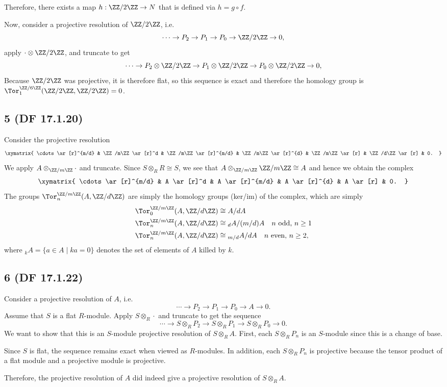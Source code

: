 \documentclass[12pt, reqno]{amsart}
\begin{document}
Therefore, there exists a map $h : \ZZ / 2\ZZ \to N$ that is defined via
$h = g \circ f$.

Now, consider a projective resolution of $\ZZ / 2\ZZ$, i.e.
\[ 
\cdots \to P_2 \to P_1 \to P_0 \to \ZZ / 2\ZZ \to 0,
\] 
apply $\cdot \otimes \ZZ / 2\ZZ$, and truncate to get
\[ 
\cdots \to P_2 \otimes \ZZ /2\ZZ \to P_1 \otimes \ZZ / 2\ZZ 
	\to P_0 \otimes \ZZ/2\ZZ \to 0,
\] 
Because $\ZZ / 2\ZZ$ was projective, it is therefore flat, so this sequence is
exact and therefore the homology group is 
$\Tor_1^{\ZZ/6\ZZ} (\ZZ / 2\ZZ , \ZZ / 2\ZZ) = 0$.

\subsection*{5 (DF 17.1.20)}

Consider the projective resolution
\[ 
\xymatrix{
\cdots \ar[r]^{m/d} & \ZZ/m\ZZ \ar[r]^d & \ZZ/m\ZZ \ar[r]^{m/d} 
	& \ZZ/m\ZZ \ar[r]^{d} & \ZZ/m\ZZ \ar[r] & \ZZ/d\ZZ \ar[r] & 0.
}
\]
We apply $A \otimes_{\ZZ/m\ZZ} \cdot$ and truncate. Since 
$S \otimes_R R \cong S$, we see that $A \otimes_{\ZZ/m\ZZ} \ZZ /m\ZZ \cong A$ and
hence we obtain the complex
\[ 
\xymatrix{
\cdots \ar[r]^{m/d} & A \ar[r]^d & A \ar[r]^{m/d} 
	& A \ar[r]^{d} & A \ar[r] & 0.
}
\]
The groups $\Tor_n^{\ZZ/m\ZZ} (A, \ZZ/d\ZZ)$ are simply the homology groups
(ker/im) of
the complex, which are simply 
\begin{align*} 
\Tor_0^{\ZZ / m\ZZ} (A, \ZZ/d\ZZ) &\cong A / dA \\
\Tor_n^{\ZZ / m\ZZ} (A, \ZZ/d\ZZ) &\cong {}_dA/(m/d)A 
			\quad \text{$n$ odd, $n \ge 1$} \\
\Tor_n^{\ZZ / m\ZZ} (A, \ZZ/d\ZZ) &\cong {}_{m/d}A/dA 
			\quad \text{$n$ even, $n \ge 2$},
\end{align*} 
where ${}_kA = \{ a \in A \mid ka = 0 \}$ denotes the set of elements of $A$
killed by $k$.

\subsection*{6 (DF 17.1.22)}

Consider a projective resolution of $A$, i.e.
\[ 
\cdots \to P_2 \to P_1 \to P_0 \to A \to 0.
\] 
Assume that $S$ is a flat $R$-module. Apply $S \otimes_R \cdot$ and truncate to
get the sequence
\[ 
\cdots \to S \otimes_R P_2 \to S \otimes_R P_1 \to S\otimes_R P_0  \to 0.
\] 
We want to show that this is an $S$-module projective resolution of $S
\otimes_R A$. First, each $S \otimes_R P_n$ is an $S$-module since this is a
change of base. 

Since $S$ is flat, the sequence remains exact when viewed as $R$-modules.
In addition, each $S \otimes_R P_n$ is projective because the tensor product of
a flat module and a projective module is projective.

Therefore, the projective resolution of $A$ did indeed
give a projective resolution of $S \otimes_R A$.
\end{document}
